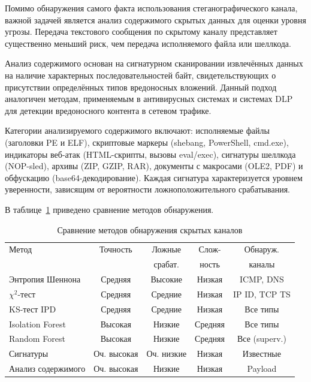 Помимо обнаружения самого факта использования стеганографического канала, важной задачей является анализ содержимого скрытых данных для оценки уровня угрозы. Передача текстового сообщения по скрытому каналу представляет существенно меньший риск, чем передача исполняемого файла или шеллкода.

Анализ содержимого основан на сигнатурном сканировании извлечённых данных на наличие характерных последовательностей байт, свидетельствующих о присутствии определённых типов вредоносных вложений. Данный подход аналогичен методам, применяемым в антивирусных системах и системах DLP для детекции вредоносного контента в сетевом трафике.

Категории анализируемого содержимого включают: исполняемые файлы (заголовки PE и ELF), скриптовые маркеры (shebang, PowerShell, cmd.exe), индикаторы веб-атак (HTML-скрипты, вызовы eval/exec), сигнатуры шеллкода (NOP-sled), архивы (ZIP, GZIP, RAR), документы с макросами (OLE2, PDF) и обфускацию (base64-декодирование). Каждая сигнатура характеризуется уровнем уверенности, зависящим от вероятности ложноположительного срабатывания.

В таблице~\ref{tab:detection_comparison} приведено сравнение методов обнаружения.

\begin{table}[htb]
\centering
\caption{Сравнение методов обнаружения скрытых каналов}
\label{tab:detection_comparison}
\small
\begin{tabular}{|l|c|c|c|c|}
\hline
Метод & Точность & Ложные & Слож- & Обнаруж. \\
 & & срабат. & ность & каналы \\
\hline
Энтропия Шеннона     & Средняя       & Высокие      & Низкая  & ICMP, DNS \\
$\chi^2$-тест        & Средняя       & Средние      & Низкая  & IP ID, TCP TS \\
KS-тест IPD          & Средняя       & Средние      & Низкая  & Все типы \\
Isolation Forest     & Высокая       & Низкие       & Средняя & Все типы \\
Random Forest        & Высокая       & Низкие       & Средняя & Все (superv.) \\
Сигнатуры            & Оч. высокая   & Оч. низкие   & Низкая  & Известные \\
Анализ содержимого   & Оч. высокая   & Низкие       & Низкая  & Payload \\
\hline
\end{tabular}
\end{table}

